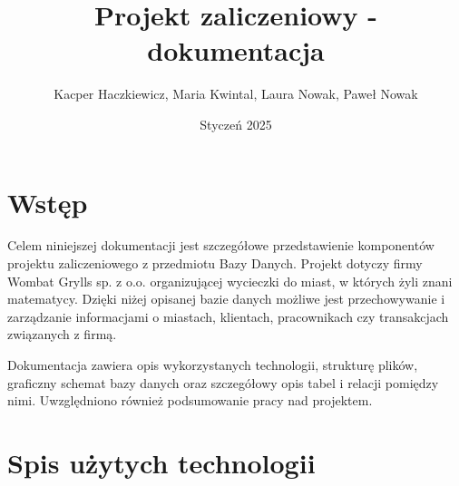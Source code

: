 \documentclass{article}
\author{Kacper Haczkiewicz, Maria Kwintal, Laura Nowak, Paweł Nowak}
\title{\textbf{Projekt zaliczeniowy - dokumentacja}}
\date{Styczeń 2025}
\begin{document}
	
	\maketitle
	
	\section{Wstęp}
	
	Celem niniejszej dokumentacji jest szczegółowe przedstawienie komponentów projektu zaliczeniowego z przedmiotu Bazy Danych. Projekt dotyczy firmy Wombat Grylls sp. z o.o. organizującej wycieczki do miast, w których żyli znani matematycy. Dzięki niżej opisanej bazie danych możliwe jest przechowywanie i zarządzanie informacjami o miastach, klientach, pracownikach czy transakcjach związanych z firmą.
	
	Dokumentacja zawiera opis wykorzystanych technologii, strukturę plików, graficzny schemat bazy danych oraz szczegółowy opis tabel i relacji pomiędzy nimi. Uwzględniono również podsumowanie pracy nad projektem.
	
	\section{Spis użytych technologii}
	
\end{document}
